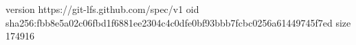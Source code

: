 version https://git-lfs.github.com/spec/v1
oid sha256:fbb8e5a02c06fbd1f6881ee2304c4c0dfe0bf93bbb7fcbc0256a61449745f7ed
size 174916
